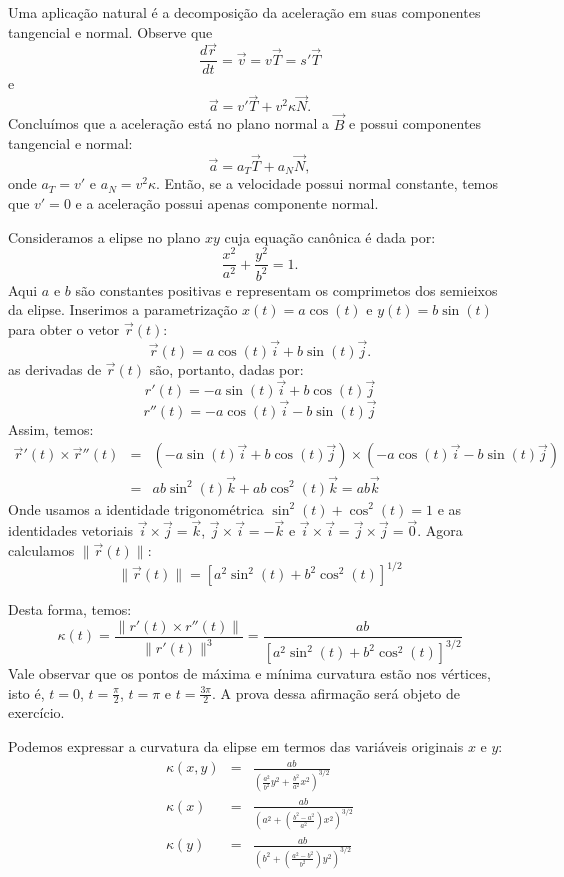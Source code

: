 \begin{obs}Uma aplicação natural é a decomposição da aceleração em suas componentes tangencial e normal. Observe que
$$
\frac{d\vec{r}}{dt}=\vec{v}=v\vec{T}=s' \vec{T}
$$
e
$$
\vec{a}=v' \vec{T}+v^2 \kappa \vec{N}.
$$
Concluímos que a aceleração está no plano normal a $\vec{B}$ e possui componentes tangencial e normal:
$$
\vec{a}=a_T \vec{T}+a_N \vec{N},
$$
onde $a_T=v'$ e $a_N=v^2\kappa$. Então, se a velocidade possui normal constante, temos que $v'=0$ e a aceleração possui apenas componente normal.

\end{obs}

\begin{ex} \label{ex_calculo_curvatura_elipse}Consideramos a elipse no plano $xy$ cuja equação canônica é dada por:
  $$\frac{x^2}{a^2} + \frac{y^2}{b^2} = 1. $$
  Aqui $a$ e $b$ são constantes positivas e representam os comprimetos dos semieixos da elipse.
  Inserimos a parametrização $x(t)=a\cos(t)$ e $y(t)=b\sin(t)$ para obter o vetor $\vec{r}(t)$:
  $$\vec{r}(t) = a\cos(t)\vec{i} + b\sin(t)\vec{j}.$$
  as derivadas de $\vec{r}(t)$ são, portanto, dadas por:
$$r'(t)=-a\sin(t)\vec{i}+b\cos(t)\vec{j}$$
$$r''(t)=-a\cos(t)\vec{i}-b\sin(t)\vec{j}$$
Assim, temos:
\begin{eqnarray*}\vec{r}'(t)\times\vec{r}''(t)&=&\left(-a\sin(t)\vec{i}+b\cos(t)\vec{j}\right)\times\left(-a\cos(t)\vec{i}-b\sin(t)\vec{j}\right)\\
&=&ab\sin^2(t)\vec{k}+ab\cos^2(t)\vec{k}=ab\vec{k}
\end{eqnarray*}
Onde usamos a identidade trigonométrica $\sin^2(t)+\cos^2(t)=1$ e as identidades vetoriais $\vec{i}\times\vec{j}=\vec{k}$, $\vec{j}\times\vec{i}=-\vec{k}$  e $\vec{i}\times\vec{i}=\vec{j}\times\vec{j}=\vec{0}$.
Agora calculamos $\|\vec{r}(t)\|$:
$$\|\vec{r}(t)\|=\left[a^2\sin^2(t)+b^2\cos^2(t)\right]^{1/2}$$

Desta forma, temos:
$$\kappa(t)=\frac{\|r'(t)\times r''(t)\|}{\|r'(t)\|^3}=\frac{ab}{\left[a^2\sin^2(t)+b^2\cos^2(t)\right]^{3/2}}$$
Vale observar que os pontos de máxima e mínima curvatura estão nos vértices, isto é, $t=0$, $t=\frac{\pi}{2}$, $t=\pi$ e $t=\frac{3\pi}{2}$. A prova dessa afirmação será objeto de exercício.

Podemos expressar a curvatura da elipse em termos das variáveis originais $x$ e $y$:
\begin{eqnarray*}
\kappa(x, y)&=&\frac{ab}{\left(\frac{a^2}{b^2}y^2+\frac{b^2}{a^2}x^2\right)^{3/2}}\\
\kappa(x)&=&\frac{ab}{\left(a^2+\left(\frac{b^2-a^2}{a^2}\right)x^2\right)^{3/2}}\\
\kappa(y)&=&\frac{ab}{\left(b^2+\left(\frac{a^2-b^2}{b^2}\right)y^2\right)^{3/2}}\\
\end{eqnarray*}
\end{ex}


